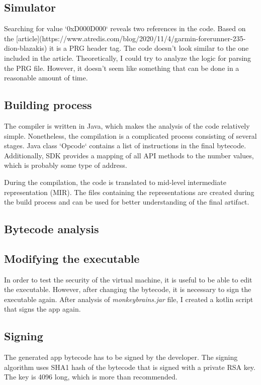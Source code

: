 \subsection{Simulator}
Searching for value `0xD000D000` reveals two references in the code.
Based on the [article](https://www.atredis.com/blog/2020/11/4/garmin-forerunner-235-dion-blazakis) it is a PRG header tag.
The code doesn't look similar to the one included in the article.
Theoretically, I could try to analyze the logic for parsing the PRG file.
However, it doesn't seem like something that can be done in a reasonable amount of time.
\subsection{Building process}
The compiler is written in Java, which makes the analysis of the code relatively simple.
Nonetheless, the compilation is a complicated process consisting of several stages.
Java class `Opcode` contains a list of instructions in the final bytecode.
Additionally, SDK provides a mapping of all API methods to the number values, which is probably some type of address.

During the compilation, the code is translated to mid-level intermediate representation (MIR).
The files containing the representations are created during the build process and can be used for better understanding of the final artifact.
\subsection{Bytecode analysis}
\subsection{Modifying the executable}
In order to test the security of the virtual machine, it is useful to be able to edit the executable.
However, after changing the bytecode, it is necessary to sign the executable again.
After analysis of \textit{monkeybrains.jar} file, I created a kotlin script that signs the app again.
\subsection{Signing}
The generated app bytecode has to be signed by the developer.
The signing algorithm uses SHA1 hash of the bytecode that is signed with a private RSA key.
The key is 4096 long, which is more than recommended.

